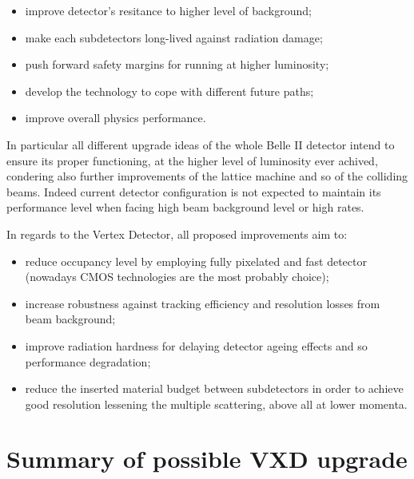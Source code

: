 \begin{itemize}
\item improve detector's resitance to higher level of background;
\item make each subdetectors long-lived against radiation damage;
\item push forward safety margins for running at higher luminosity;
\item develop the technology to cope with different future paths;
\item improve overall physics performance.
\end{itemize}


In particular all different upgrade ideas of the whole Belle II detector intend to ensure its proper functioning, at the higher level of luminosity ever achived, condering also further improvements of the lattice machine and so of the colliding beams. Indeed current detector configuration is not expected to maintain its performance level when facing high beam background level or high rates.

In regards to the Vertex Detector, all proposed improvements aim to:

\begin{itemize}
\item reduce occupancy level by employing fully pixelated and fast detector (nowadays CMOS technologies are the most probably choice);
\item increase robustness against tracking efficiency and resolution losses from beam background;
\item improve radiation hardness for delaying detector ageing effects and so performance degradation;
\item reduce the inserted material budget between subdetectors in order to achieve good resolution lessening the multiple scattering, above all at lower momenta.
\end{itemize}




\section{Summary of possible VXD upgrade}

\begin{comment}
In particular there are three fundamental aspects in physics performance (concern) in regards to VXD and its upgrade:

\begin{itemize}
\itemsep0em
\item Low momentum track finding; 
\item Vertex and IP resolution;
\item Triggers.
\item integration time
\end{itemize}

\end{comment}

